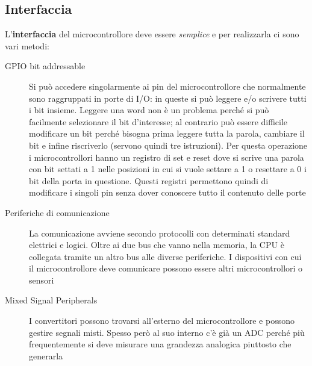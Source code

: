 \documentclass[12pt, a4paper]{report}
\begin{document}
\subsection{Interfaccia}
L'\textbf{interfaccia} del microcontrollore deve essere \textit{semplice} e per realizzarla ci sono vari metodi:
\begin{description}
    \item[GPIO bit addressable] Si può accedere singolarmente ai pin del microcontrollore che normalmente sono raggruppati in porte di I/O: in queste si può leggere e/o scrivere tutti i bit insieme. Leggere una word non è un problema perché si può facilmente selezionare il bit d'interesse; al contrario può essere difficile modificare un bit perché bisogna prima leggere tutta la parola, cambiare il bit e infine riscriverlo (servono quindi tre istruzioni). Per questa operazione i microcontrollori hanno un registro di set e reset dove si scrive una parola con bit settati a 1 nelle posizioni in cui si vuole settare a 1 o resettare a 0 i bit della porta in questione. Questi registri permettono quindi di modificare i singoli pin senza dover conoscere tutto il contenuto delle porte
    \item[Periferiche di comunicazione]La comunicazione avviene secondo protocolli con determinati standard elettrici e logici. Oltre ai due bus che vanno nella memoria, la CPU è collegata tramite un altro bus alle diverse periferiche. I dispositivi con cui il microcontrollore deve comunicare possono essere altri microcontrollori o sensori
    \item[Mixed Signal Peripherals]I convertitori possono trovarsi all'esterno del microcontrollore e possono gestire segnali misti. Spesso però al suo interno c'è già un ADC perché più frequentemente si deve misurare una grandezza analogica piuttosto che generarla

\end{description}
\end{document}
